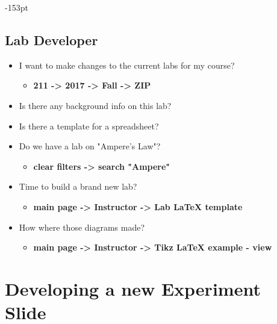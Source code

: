 \begin{adjustwidth}{}{-153pt}
\subsection{\bf Lab Developer}
\begin{itemize}
\item I want to make changes to the current labs for my course?
\begin{itemize} \item {\bf 211 -> 2017 -> Fall -> ZIP}  \end{itemize}
\item Is there any background info on this lab?
\item Is there a template for a spreadsheet?
\item Do we have a lab on "Ampere's Law"?
\begin{itemize} \item {\bf clear filters -> search "Ampere"}  \end{itemize}
\item Time to build a brand new lab?
\begin{itemize} \item {\bf main page -> Instructor -> Lab LaTeX template}\end{itemize}
\item How where those diagrams made?
\begin{itemize} \item {\bf main page -> Instructor -> Tikz LaTeX example - view}\end{itemize}
\end{itemize}

\section{\bf Developing a new Experiment Slide}


\end{adjustwidth}

